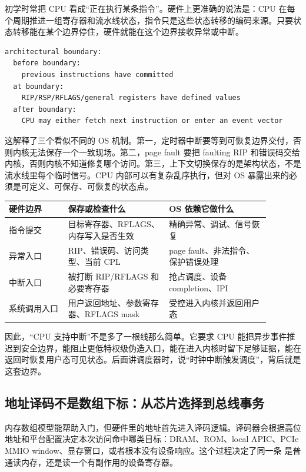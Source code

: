 初学时常把 CPU 看成“正在执行某条指令”。硬件上更准确的说法是：CPU 在每个周期推进一组寄存器和流水线状态，指令只是这些状态转移的编码来源。只要状态转移能在某个边界停住，硬件就能在这个边界接收异常或中断。

\begin{lstlisting}
architectural boundary:
  before boundary:
    previous instructions have committed
  at boundary:
    RIP/RSP/RFLAGS/general registers have defined values
  after boundary:
    CPU may either fetch next instruction or enter an event vector
\end{lstlisting}

这解释了三个看似不同的 OS 机制。第一，定时器中断要等到可恢复边界交付，否则内核无法保存一个一致现场。第二，page fault 要把 faulting RIP 和错误码交给内核，否则内核不知道修复哪个访问。第三，上下文切换保存的是架构状态，不是流水线里每个临时信号。CPU 内部可以有复杂乱序执行，但对 OS 暴露出来的必须是可定义、可保存、可恢复的状态点。

\begin{longtable}{p{0.2\linewidth}p{0.34\linewidth}p{0.34\linewidth}}
\toprule
硬件边界 & 保存或检查什么 & OS 依赖它做什么 \\
\midrule
指令提交 & 目标寄存器、RFLAGS、内存写入是否生效 & 精确异常、调试、信号恢复 \\
异常入口 & RIP、错误码、访问类型、当前 CPL & page fault、非法指令、保护错误处理 \\
中断入口 & 被打断 RIP/RFLAGS 和必要寄存器 & 抢占调度、设备 completion、IPI \\
系统调用入口 & 用户返回地址、参数寄存器、RFLAGS mask & 受控进入内核并返回用户态 \\
\bottomrule
\end{longtable}

因此，“CPU 支持中断”不是多了一根线那么简单。它要求 CPU 能把异步事件推迟到安全边界，能阻止更低特权级伪造入口，能在进入内核时留下足够证据，能在返回时恢复用户态可见状态。后面讲调度器时，说“时钟中断触发调度”，背后就是这套边界。

\subsection{地址译码不是数组下标：从芯片选择到总线事务}

内存数组模型能帮助入门，但硬件里的地址首先进入译码逻辑。译码器会根据高位地址和平台配置决定本次访问命中哪类目标：DRAM、ROM、local APIC、PCIe MMIO window、显存窗口，或者根本没有设备响应。这个过程决定了同一条  是普通读内存，还是读一个有副作用的设备寄存器。

